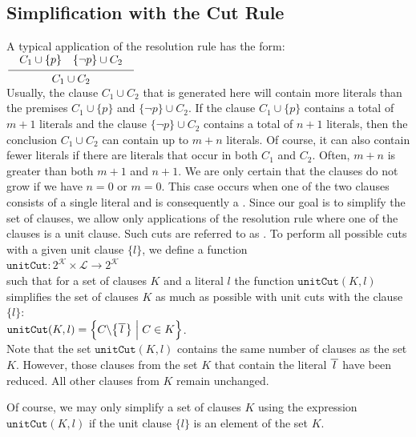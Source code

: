 \subsection{Simplification with the Cut Rule}
A typical application of the resolution rule has the form: \\[0.2cm]
\hspace*{1.3cm} $\schluss{ C_1 \cup \{p\} \quad \{\neg p\} \cup C_2}{C_1 \cup C_2}$
\\[0.2cm]
Usually, the clause $C_1 \cup C_2$ that is  generated here will contain more literals
than the premises $C_1 \cup \{p\}$ and $\{\neg p\} \cup C_2$. If the
clause $C_1 \cup \{p\}$ contains a total of $m+1$ literals and the clause
$\{\neg p\} \cup C_2$ contains a total of $n+1$ literals, then the conclusion $C_1 \cup C_2$
can contain up to $m + n$ literals. Of course, it can also contain fewer literals
if there are literals that occur in both $C_1$ and $C_2$.
Often, $m + n$ is greater than both $m + 1$ and $n + 1$.  We are only certain that the clauses
do not grow if we have $n = 0$ or $m = 0$.
This case occurs when one of the two clauses consists  of a single literal
and is consequently a .  Since our goal is to simplify the set of clauses,
we allow only applications of the resolution rule where
one of the clauses is a unit clause. Such cuts are referred to as
. To perform all possible cuts with a given unit clause $\{l\}$,
we define a function
\\[0.2cm]
\hspace*{1.3cm}
$\texttt{unitCut}: 2^\mathcal{K} \times \mathcal{L} \rightarrow 2^\mathcal{K}$
\\[0.2cm]
such that for a set of clauses $K$ and a literal $l$ the function
$\texttt{unitCut}(K,l)$ simplifies the set of clauses $K$ as much as possible with unit cuts with the clause
$\{l\}$:
\\[0.2cm]
\hspace*{1.3cm}
$\texttt{unitCut}(K,l) = \Bigl\{ C \backslash \bigl\{ \overline{\,l\,} \bigr\} \;\Big|\; C \in K \Bigr\}$.
\\[0.2cm]
Note that the set $\texttt{unitCut}(K,l)$ contains the same number of clauses as the set
$K$. However, those clauses from the set $K$ that contain the literal $\overline{\,l\,}$
have been reduced. All other clauses from $K$ remain unchanged.

Of course, we may only simplify a set of clauses $K$ using the expression $\texttt{unitCut}(K, l)$ if
the unit clause $\{l\}$ is an element of the set $K$.

